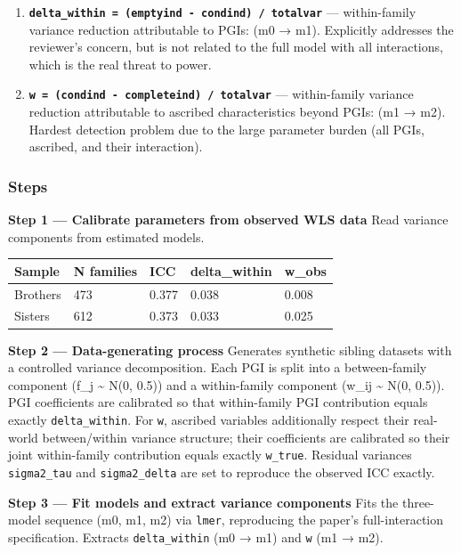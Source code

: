 \documentclass[
]{article}
\newcounter{none} %
\begin{document}
\begin{enumerate}
\def\labelenumi{\arabic{enumi}.}
\item
  \textbf{\texttt{delta\_within\ =\ (emptyind\ -\ condind)\ /\ totalvar}}
  --- within-family variance reduction attributable to PGIs: (m0 → m1).
  Explicitly addresses the reviewer's concern, but is not related to the
  full model with all interactions, which is the real threat to power.
\item
  \textbf{\texttt{w\ =\ (condind\ -\ completeind)\ /\ totalvar}} ---
  within-family variance reduction attributable to ascribed
  characteristics beyond PGIs: (m1 → m2). Hardest detection problem due
  to the large parameter burden (all PGIs, ascribed, and their
  interaction).
\end{enumerate}

\subsubsection{Steps}\label{steps}

\textbf{Step 1 --- Calibrate parameters from observed WLS data} Read
variance components from estimated models.

{\def\LTcaptype{none} %
\begin{longtable}[]{@{}lllll@{}}
\toprule\noalign{}
Sample & N families & ICC & delta\_within & w\_obs \\
\midrule\noalign{}
\endhead
\bottomrule\noalign{}
\endlastfoot
Brothers & 473 & 0.377 & 0.038 & 0.008 \\
Sisters & 612 & 0.373 & 0.033 & 0.025 \\
\end{longtable}
}

\textbf{Step 2 --- Data-generating process} Generates synthetic sibling
datasets with a controlled variance decomposition. Each PGI is split
into a between-family component (f\_j \textasciitilde{} N(0, 0.5)) and a
within-family component (w\_ij \textasciitilde{} N(0, 0.5)). PGI
coefficients are calibrated so that within-family PGI contribution
equals exactly \texttt{delta\_within}. For \texttt{w}, ascribed
variables additionally respect their real-world between/within variance
structure; their coefficients are calibrated so their joint
within-family contribution equals exactly \texttt{w\_true}. Residual
variances \texttt{sigma2\_tau} and \texttt{sigma2\_delta} are set to
reproduce the observed ICC exactly.

\textbf{Step 3 --- Fit models and extract variance components} Fits the
three-model sequence (m0, m1, m2) via \texttt{lmer}, reproducing the
paper's full-interaction specification. Extracts \texttt{delta\_within}
(m0 → m1) and \texttt{w} (m1 → m2).
\end{document}
